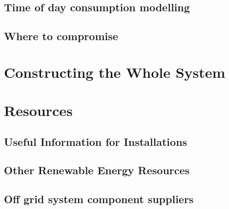 \documentclass{article}
\theoremstyle{definition}
\theoremstyle{definition}
\theoremstyle{remark}
\begin{document}
  \subsection{Time of day consumption modelling} %
  \label{sub:time_of_day_consumption_modelling}
  

  \subsection{Where to compromise} %
  \label{sub:where_to_compromise}
  


\section{Constructing the Whole System} %
\label{sec:constructing_the_whole_system}


\section{Resources} %
\label{sec:resources}

  \subsection{Useful Information for Installations} %
  \label{sub:useful_information_for_installations}
  

  \subsection{Other Renewable Energy Resources} %
  \label{sub:other_renewable_energy_resources}
  

  \subsection{Off grid system component suppliers} %
  \label{sub:off_grid_system_component_suppliers}
  
\end{document}
